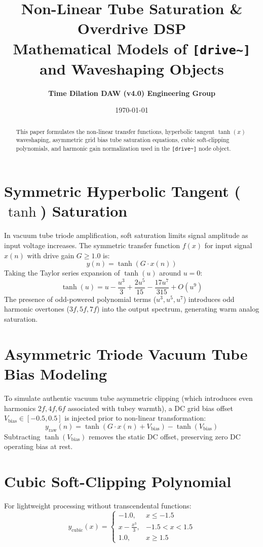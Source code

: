 \documentclass[11pt,a4paper]{article}
\title{\textbf{\Huge Non-Linear Tube Saturation \& Overdrive DSP}\\[0.5em]
\Large Mathematical Models of \texttt{[drive\textasciitilde{}]} and Waveshaping Objects}
\author{\textbf{Time Dilation DAW (v4.0) Engineering Group}}
\date{\today}
\begin{document}
\maketitle

\begin{abstract}
This paper formulates the non-linear transfer functions, hyperbolic tangent $\tanh(x)$ waveshaping, asymmetric grid bias tube saturation equations, cubic soft-clipping polynomials, and harmonic gain normalization used in the \texttt{[drive\textasciitilde{}]} node object.
\end{abstract}

\section{Symmetric Hyperbolic Tangent ($\tanh$) Saturation}
In vacuum tube triode amplification, soft saturation limits signal amplitude as input voltage increases. The symmetric transfer function $f(x)$ for input signal $x(n)$ with drive gain $G \ge 1.0$ is:
\begin{equation}
y(n) = \tanh\left( G \cdot x(n) \right)
\end{equation}
Taking the Taylor series expansion of $\tanh(u)$ around $u = 0$:
\begin{equation}
\tanh(u) = u - \frac{u^3}{3} + \frac{2u^5}{15} - \frac{17u^7}{315} + O(u^9)
\end{equation}
The presence of odd-powered polynomial terms ($u^3, u^5, u^7$) introduces odd harmonic overtones ($3f, 5f, 7f$) into the output spectrum, generating warm analog saturation.

\section{Asymmetric Triode Vacuum Tube Bias Modeling}
To simulate authentic vacuum tube asymmetric clipping (which introduces even harmonics $2f, 4f, 6f$ associated with tubey warmth), a DC grid bias offset $V_{\text{bias}} \in [-0.5, 0.5]$ is injected prior to non-linear transformation:
\begin{equation}
y_{\text{raw}}(n) = \tanh\left( G \cdot x(n) + V_{\text{bias}} \right) - \tanh(V_{\text{bias}})
\end{equation}
Subtracting $\tanh(V_{\text{bias}})$ removes the static DC offset, preserving zero DC operating bias at rest.

\section{Cubic Soft-Clipping Polynomial}
For lightweight processing without transcendental functions:
\begin{equation}
y_{\text{cubic}}(x) =
\begin{cases}
-1.0, & x \le -1.5 \\
x - \frac{x^3}{3}, & -1.5 < x < 1.5 \\
1.0, & x \ge 1.5
\end{cases}
\end{equation}
\end{document}

